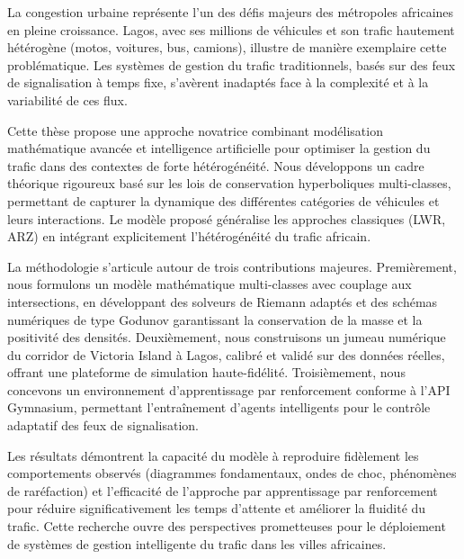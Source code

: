 
\noindent
La congestion urbaine représente l'un des défis majeurs des métropoles africaines en pleine croissance. Lagos, avec ses millions de véhicules et son trafic hautement hétérogène (motos, voitures, bus, camions), illustre de manière exemplaire cette problématique. Les systèmes de gestion du trafic traditionnels, basés sur des feux de signalisation à temps fixe, s'avèrent inadaptés face à la complexité et à la variabilité de ces flux.

Cette thèse propose une approche novatrice combinant modélisation mathématique avancée et intelligence artificielle pour optimiser la gestion du trafic dans des contextes de forte hétérogénéité. Nous développons un cadre théorique rigoureux basé sur les lois de conservation hyperboliques multi-classes, permettant de capturer la dynamique des différentes catégories de véhicules et leurs interactions. Le modèle proposé généralise les approches classiques (LWR, ARZ) en intégrant explicitement l'hétérogénéité du trafic africain.

La méthodologie s'articule autour de trois contributions majeures. Premièrement, nous formulons un modèle mathématique multi-classes avec couplage aux intersections, en développant des solveurs de Riemann adaptés et des schémas numériques de type Godunov garantissant la conservation de la masse et la positivité des densités. Deuxièmement, nous construisons un jumeau numérique du corridor de Victoria Island à Lagos, calibré et validé sur des données réelles, offrant une plateforme de simulation haute-fidélité. Troisièmement, nous concevons un environnement d'apprentissage par renforcement conforme à l'API Gymnasium, permettant l'entraînement d'agents intelligents pour le contrôle adaptatif des feux de signalisation.

Les résultats démontrent la capacité du modèle à reproduire fidèlement les comportements observés (diagrammes fondamentaux, ondes de choc, phénomènes de raréfaction) et l'efficacité de l'approche par apprentissage par renforcement pour réduire significativement les temps d'attente et améliorer la fluidité du trafic. Cette recherche ouvre des perspectives prometteuses pour le déploiement de systèmes de gestion intelligente du trafic dans les villes africaines.
